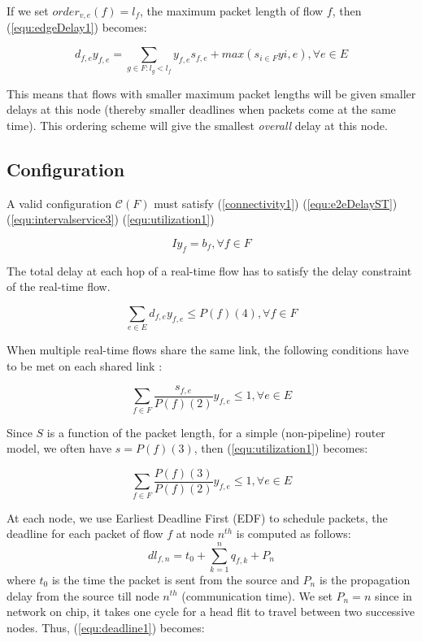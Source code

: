 \documentclass[a4]{article}
\begin{document}
If we set $order_{v,e}(f)=l_f$, the maximum packet length of flow $f$, then
(\ref{equ:edgeDelay1}) becomes:

\begin{equation}\label{equ:edgeDelayPacketLength}
d_{f,e}y_{f,e} = \sum_{g \in F:l_g < l_f}y_{f,e}s_{f,e} +
max(s_{i \in F}y{i,e}), \forall e \in E
\end{equation}

This means that flows with smaller maximum packet lengths will be given smaller
delays at this node (thereby smaller deadlines when packets come at the same time). This ordering scheme 
will give the smallest {\em overall} delay at this node.

\subsection{Configuration}
A valid configuration $\mathcal{C}(F)$ must satisfy (\ref{connectivity1}) 
(\ref{equ:e2eDelayST}) (\ref{equ:intervalservice3}) (\ref{equ:utilization1})

\begin{equation}\label{connectivity1} Iy_f=b_f,\forall f \in F
\end{equation}

The total delay at each hop of a real-time flow has to satisfy the delay constraint
of the real-time flow.

\begin{equation}\label{equ:e2eDelayST}
\sum_{e \in E}d_{f,e}y_{f,e} \leq P(f)(4), \forall f \in F
\end{equation}

When multiple real-time flows share the same link, the following conditions
 have to be met on each shared link \cite{Ferrari90ascheme, VermaJitter91}:

\begin{equation}\label{equ:utilization1}
\sum_{f \in F}\frac{s_{f,e}}{P(f)(2)}y_{f,e} \leq 1, \forall e \in E
\end{equation}

Since $S$ is a function of the packet length, for a simple (non-pipeline) router
model, we often have $s=P(f)(3)$, then (\ref{equ:utilization1}) becomes:

\begin{equation}\label{equ:utilization2}
\sum_{f \in F}\frac{P(f)(3)}{P(f)(2)}y_{f,e} \leq 1, \forall e \in E
\end{equation}

At each node, we use Earliest Deadline First (EDF) \cite{VermaJitter91} 
to schedule packets, the deadline for each packet of flow $f$ at node $n^{th}$
is computed as follows: 
\begin{equation}\label{equ:deadline1}
dl_{f,n}=t_0 + \sum_{k=1}^{n}q_{f,k}+P_n
\end{equation}
where $t_0$ is the time the packet is sent from the source and $P_n$ is the propagation
delay from the source till node $n^{th}$ (communication time). We set
$P_n=n$ since in network on chip, it takes one cycle for a head flit to travel
between two successive nodes. Thus, (\ref{equ:deadline1}) becomes:
\end{document}
